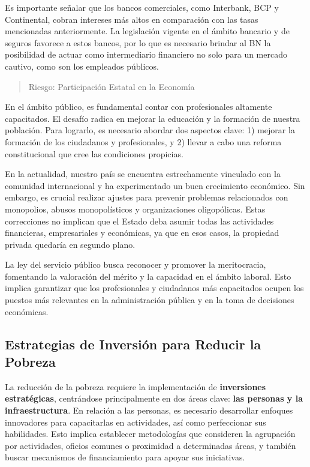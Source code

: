 \documentclass[
  letterpaper,
  DIV=11,
  numbers=noendperiod]{scrartcl}
\begin{document}
Es importante señalar que los bancos comerciales, como Interbank, BCP y
Continental, cobran intereses más altos en comparación con las tasas
mencionadas anteriormente. La legislación vigente en el ámbito bancario
y de seguros favorece a estos bancos, por lo que es necesario brindar al
BN la posibilidad de actuar como intermediario financiero no solo para
un mercado cautivo, como son los empleados públicos.

\begin{quote}
Riesgo: Participación Estatal en la Economía
\end{quote}

En el ámbito público, es fundamental contar con profesionales altamente
capacitados. El desafío radica en mejorar la educación y la formación de
nuestra población. Para lograrlo, es necesario abordar dos aspectos
clave: 1) mejorar la formación de los ciudadanos y profesionales, y 2)
llevar a cabo una reforma constitucional que cree las condiciones
propicias.

En la actualidad, nuestro país se encuentra estrechamente vinculado con
la comunidad internacional y ha experimentado un buen crecimiento
económico. Sin embargo, es crucial realizar ajustes para prevenir
problemas relacionados con monopolios, abusos monopolísticos y
organizaciones oligopólicas. Estas correcciones no implican que el
Estado deba asumir todas las actividades financieras, empresariales y
económicas, ya que en esos casos, la propiedad privada quedaría en
segundo plano.

La ley del servicio público busca reconocer y promover la meritocracia,
fomentando la valoración del mérito y la capacidad en el ámbito laboral.
Esto implica garantizar que los profesionales y ciudadanos más
capacitados ocupen los puestos más relevantes en la administración
pública y en la toma de decisiones económicas.

\hypertarget{estrategias-de-inversiuxf3n-para-reducir-la-pobreza}{%
\subsection{Estrategias de Inversión para Reducir la
Pobreza}\label{estrategias-de-inversiuxf3n-para-reducir-la-pobreza}}

La reducción de la pobreza requiere la implementación de
\textbf{inversiones estratégicas}, centrándose principalmente en dos
áreas clave: \textbf{las personas y la infraestructura}. En relación a
las personas, es necesario desarrollar enfoques innovadores para
capacitarlas en actividades, así como perfeccionar sus habilidades. Esto
implica establecer metodologías que consideren la agrupación por
actividades, oficios comunes o proximidad a determinadas áreas, y
también buscar mecanismos de financiamiento para apoyar sus iniciativas.
\end{document}
